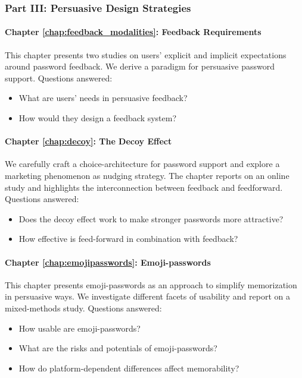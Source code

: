 \subsubsection{Part III: Persuasive Design Strategies}
\paragraph{Chapter \ref{chap:feedback_modalities}: Feedback Requirements} %
This chapter presents two studies on users' explicit and implicit expectations around password feedback. We derive a paradigm for persuasive password support. 
Questions answered: \vspace*{-5pt} \begin{itemize}[leftmargin=*,itemsep=-5pt]
	\item What are users' needs in persuasive feedback?
	\item How would they design a feedback system?
\end{itemize}

\paragraph{Chapter \ref{chap:decoy}: The Decoy Effect} %
We carefully craft a choice-architecture for password support and explore a marketing phenomenon as nudging strategy. The chapter reports on an online study and highlights the interconnection between feedback and feedforward. 
Questions answered: \vspace*{-5pt} \begin{itemize}[leftmargin=*,itemsep=-5pt]
	\item Does the decoy effect work to make stronger passwords more attractive?
	\item How effective is feed-forward in combination with feedback?
\end{itemize}

\paragraph{Chapter \ref{chap:emojipasswords}: Emoji-passwords} %
This chapter presents emoji-passwords as an approach to simplify memorization in persuasive ways. We investigate different facets of usability and report on a mixed-methods study. 
Questions answered: \vspace*{-5pt} \begin{itemize}[leftmargin=*,itemsep=-5pt]
	\item How usable are emoji-passwords?
	\item What are the risks and potentials of emoji-passwords?
	\item How do platform-dependent differences affect memorability?
\end{itemize}


